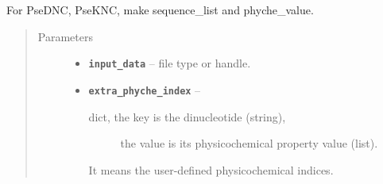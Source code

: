 \documentclass[letterpaper,10pt,english]{sphinxmanual}
\begin{document}
\begin{fulllineitems}
\label{reference/PyDNApsenac:PyDNApsenac.GetSequenceListAndPhycheValuePsednc}
For PseDNC, PseKNC, make sequence\_list and phyche\_value.
\begin{quote}\begin{description}
\item[{Parameters}] \leavevmode\begin{itemize}
\item {} 
\textbf{\texttt{input\_data}} -- file type or handle.

\item {} 
\textbf{\texttt{extra\_phyche\_index}} -- \begin{description}
\item[{dict, the key is the dinucleotide (string),}] \leavevmode
the value is its physicochemical property value (list).

\end{description}

It means the user-defined physicochemical indices.


\end{itemize}

\end{description}\end{quote}

\end{fulllineitems}

\end{document}
